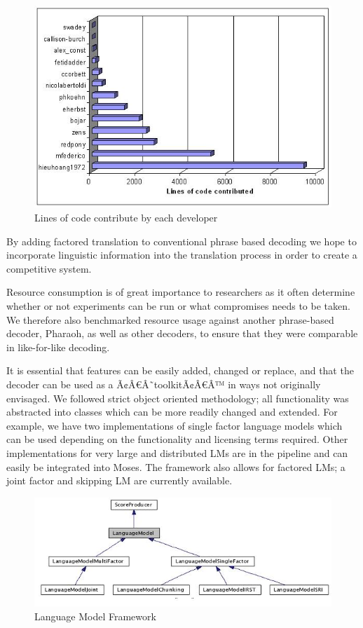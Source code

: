 \documentclass[11pt]{report}
\theoremstyle{plain}
\begin{document}
{\begin{figure}[h]
\begin{center}
\centering
\includegraphics[scale=0.8]{hieu-1}
\end{center}
\caption{Lines of code contribute by each developer}
\end{figure}

By adding factored translation to conventional phrase based decoding we hope to incorporate linguistic information into the translation process in order to create a competitive system.

Resource consumption is of great importance to researchers as it often determine whether or not experiments can be run or what compromises needs to be taken. We therefore also benchmarked resource usage against another phrase-based decoder, Pharaoh, as well as other decoders, to ensure that they were comparable in like-for-like decoding.

It is essential that features can be easily added, changed or replace, and that the decoder can be used as a Ã¢Â€Â˜toolkitÃ¢Â€Â™ in ways not originally envisaged. We followed strict object oriented methodology; all functionality was abstracted into classes which can be more readily changed and extended. For example, we have two implementations of single factor language models which can be used depending on the functionality and licensing terms required. Other implementations for very large and distributed LMs are in the pipeline and can easily be integrated into Moses. The framework also allows for factored LMs; a joint factor and skipping LM are currently available.

\begin{figure}[h]
\begin{center}
\includegraphics[scale=1]{hieu-2}
\end{center}
\caption{Language Model Framework}
\end{figure}

}
\end{document}
